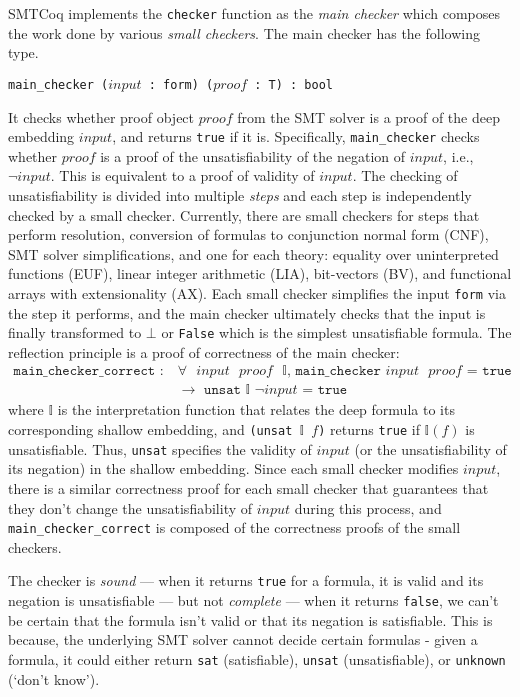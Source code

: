 \documentclass{article}
\begin{document}
	SMTCoq implements the \texttt{checker}
	function as the \textit{main checker}
	which composes the work done 
	by various \textit{small checkers}. 
	The main checker has the following 
	type.
	\begin{center}
		\texttt{main\_checker ($input$ : 
			form) ($proof$ : T) : bool}	
	\end{center}
	It checks whether proof object
	$proof$ from the SMT solver 
	is a proof of the deep embedding 
	$input$, and returns \texttt{true} if 
	it is. Specifically, \texttt{main\_checker}
	checks whether $proof$ is a proof of 
	the unsatisfiability of the negation 
	of $input$, i.e., $\neg input$. This is 
	equivalent to a proof of validity of 
	$input$. The checking of unsatisfiability 
	is divided into multiple \textit{steps}
	and each step is independently checked 
	by a small checker. Currently, there are 
	small checkers for steps that perform 
	resolution, conversion of formulas to 
	conjunction normal form (CNF), SMT 
	solver simplifications, and one for 
	each theory: equality over 
	uninterpreted functions (EUF), linear 
	integer arithmetic (LIA), bit-vectors 
	(BV), and functional arrays with 
	extensionality (AX). Each small
	checker simplifies the input 
	\texttt{form} via the step it performs,
	and the main checker ultimately checks
	that the input is finally transformed to 
	$\bot$ or \texttt{False} which is the 
	simplest unsatisfiable formula.
	The reflection principle is a proof of 
	correctness of the main checker:
	\begin{align*}
		\texttt{main\_checker\_correct
		: } &\texttt{$\forall$ 
		$input$ $proof$ $\mathbb{I}$, 
		main\_checker $input$ 
		$proof$ = true}\\
		&\texttt{$\to$ 
		unsat $\mathbb{I}$
		$\neg input$ = true}
	\end{align*}
	where $\mathbb{I}$ is the 
	interpretation function that 
	relates the deep formula to its 
	corresponding shallow embedding,
	and \texttt{(unsat $\mathbb{I}$ $f$)} 
	returns \texttt{true} if 
	$\mathbb{I}(f)$ is unsatisfiable. 
	Thus, \texttt{unsat} specifies 
	the validity of $input$ 
	(or the unsatisfiability of its 
	negation) in the shallow 
	embedding. Since each small
	checker modifies $input$, 
	there is a similar correctness 
	proof for each small checker 
	that guarantees that they don't
	change the unsatisfiability of 
	$input$ during this process, and 
	\texttt{main\_checker\_correct}
	is composed of the correctness
	proofs of the small checkers.
	
	The checker is \textit{sound} ---
	when it returns \texttt{true} for 
	a formula, it is valid and its 
	negation is unsatisfiable --- but 
	not \textit{complete} --- when it 
	returns \texttt{false}, we can't be 
	certain that the formula isn't valid
	or that its negation is satisfiable.
	This is because, the underlying SMT 
	solver 
	cannot decide certain formulas -
	given a formula, it could either 
	return \texttt{sat} 
	(satisfiable), \texttt{unsat} 
	(unsatisfiable), or 
	\texttt{unknown} (`don't know').
\end{document}
